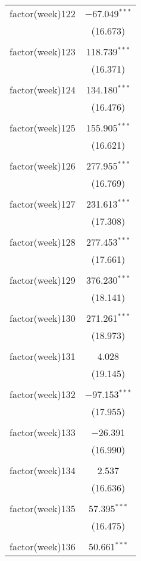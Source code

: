 \documentclass{article}
\begin{document}
\begin{table}[!htbp]
\begin{tabular}{@{\extracolsep{5pt}}lc}
 factor(week)122 & $-$67.049$^{***}$ \\ 
  & (16.673) \\ 
  & \\ 
 factor(week)123 & 118.739$^{***}$ \\ 
  & (16.371) \\ 
  & \\ 
 factor(week)124 & 134.180$^{***}$ \\ 
  & (16.476) \\ 
  & \\ 
 factor(week)125 & 155.905$^{***}$ \\ 
  & (16.621) \\ 
  & \\ 
 factor(week)126 & 277.955$^{***}$ \\ 
  & (16.769) \\ 
  & \\ 
 factor(week)127 & 231.613$^{***}$ \\ 
  & (17.308) \\ 
  & \\ 
 factor(week)128 & 277.453$^{***}$ \\ 
  & (17.661) \\ 
  & \\ 
 factor(week)129 & 376.230$^{***}$ \\ 
  & (18.141) \\ 
  & \\ 
 factor(week)130 & 271.261$^{***}$ \\ 
  & (18.973) \\ 
  & \\ 
 factor(week)131 & 4.028 \\ 
  & (19.145) \\ 
  & \\ 
 factor(week)132 & $-$97.153$^{***}$ \\ 
  & (17.955) \\ 
  & \\ 
 factor(week)133 & $-$26.391 \\ 
  & (16.990) \\ 
  & \\ 
 factor(week)134 & 2.537 \\ 
  & (16.636) \\ 
  & \\ 
 factor(week)135 & 57.395$^{***}$ \\ 
  & (16.475) \\ 
  & \\ 
 factor(week)136 & 50.661$^{***}$ \\ 

\end{tabular}
\end{table}
\end{document}
